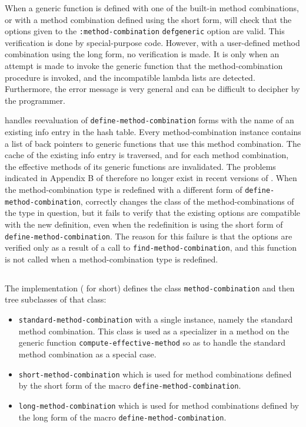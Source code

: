 When a generic function is defined with one of the built-in method
combinations, or with a method combination defined using the short
form, \sbcl{} will check that the options given to the
\texttt{:method-combination} \texttt{defgeneric} option are valid.
This verification is done by special-purpose code.  However, with a
user-defined method combination using the long form, no verification
is made.  It is only when an attempt is made to invoke the generic
function that the method-combination procedure is invoked, and the
incompatible lambda lists are detected.  Furthermore, the error
message is very general and can be difficult to decipher by the
programmer.

\sbcl{} handles reevaluation of \texttt{define-method-combination}
forms with the name of an existing info entry in the hash table.
Every method-combination instance contains a list of back pointers to
generic functions that use this method combination.  The cache of the
existing info entry is traversed, and for each method combination, the
effective methods of its generic functions are invalidated.
The problems indicated in Appendix B of \cite{verna.18.els} therefore
no longer exist in recent versions of \sbcl{}.  When the
method-combination type is redefined with a different form of
\texttt{define-method-combination}, \sbcl{} correctly changes the
class of the method-combinations of the type in question, but it fails
to verify that the existing options are compatible with the new
definition, even when the redefinition is using the short form of
\texttt{define-method-combination}.  The reason for this failure is
that the options are verified only as a result of a call to
\texttt{find-method-combination}, and this function is not called when
a method-combination type is redefined.

\subsection{\clcl{}}
\label{sec-ccl}

The \clcl{} implementation (\ccl{} for short) defines the class
\texttt{method-combination} and then tree subclasses of that class:

\begin{itemize}
\item \texttt{standard-method-combination} with a single instance,
  namely the standard method combination.  This class is used as a
  specializer in a method on the generic function
  \texttt{compute-effective-method} so as to handle the standard
  method combination as a special case.
\item \texttt{short-method-combination} which is used for method
  combinations defined by the short form of the macro
  \texttt{define-method-combination}.
\item \texttt{long-method-combination} which is used for method
  combinations defined by the long form of the macro
  \texttt{define-method-combination}.
\end{itemize}

